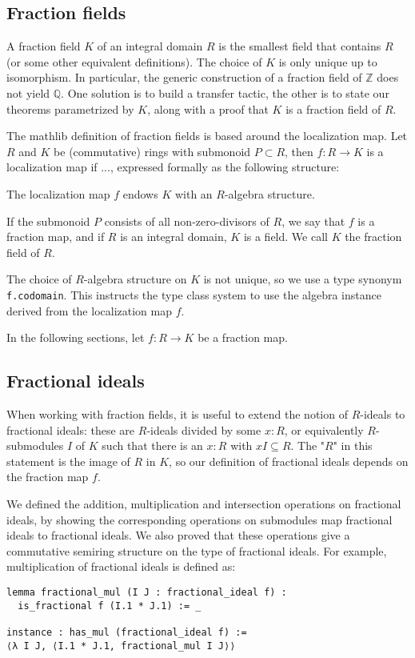 \documentclass[a4paper,USenglish,cleveref, autoref, thm-restate]{lipics-v2021}
\newcommand{\lean}[1]{\texttt{#1}\xspace} %
\newcommand{\Q}{\mathbb{Q}}
\newcommand{\Z}{\mathbb{Z}}
\begin{document}
\subsection{Fraction fields}

A fraction field $K$ of an integral domain $R$ is the smallest field that contains $R$ (or some other equivalent definitions).
The choice of $K$ is only unique up to isomorphism.
In particular, the generic construction of a fraction field of $\Z$ does not yield $\Q$.
One solution is to build a transfer tactic, the other is to state our theorems parametrized by $K$, along with a proof that $K$ is a fraction field of $R$.

The mathlib definition of fraction fields is based around the localization map. Let $R$ and $K$ be (commutative) rings with submonoid $P \subset R$, then $f : R \to K$ is a localization map if ..., expressed formally as the following structure:

The localization map $f$ endows $K$ with an $R$-algebra structure.

If the submonoid $P$ consists of all non-zero-divisors of $R$, we say that $f$ is a fraction map, and if $R$ is an integral domain, $K$ is a field. We call $K$ the fraction field of $R$.

The choice of $R$-algebra structure on $K$ is not unique, so we use a type synonym \lean{f.codomain}. This instructs the type class system to use the algebra instance derived from the localization map $f$.

In the following sections, let $f : R \to K$ be a fraction map.

\subsection{Fractional ideals}

When working with fraction fields, it is useful to extend the notion of $R$-ideals to fractional ideals: these are $R$-ideals divided by some $x : R$, or equivalently $R$-submodules $I$ of $K$ such that there is an $x : R$ with $x I \subseteq R$. The "$R$" in this statement is the image of $R$ in $K$, so our definition of fractional ideals depends on the fraction map $f$.

We defined the addition, multiplication and intersection operations on fractional ideals,
by showing the corresponding operations on submodules map fractional ideals to fractional ideals.
We also proved that these operations give a commutative semiring structure on the type of fractional ideals.
For example, multiplication of fractional ideals is defined as:
\begin{lstlisting}
lemma fractional_mul (I J : fractional_ideal f) :
  is_fractional f (I.1 * J.1) := _

instance : has_mul (fractional_ideal f) :=
⟨λ I J, ⟨I.1 * J.1, fractional_mul I J⟩⟩
\end{lstlisting}
\end{document}
